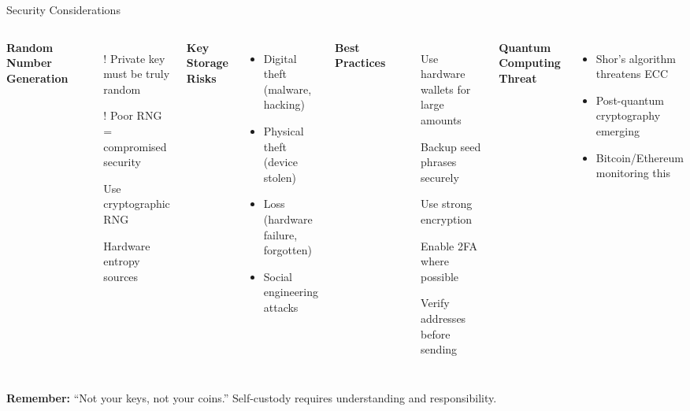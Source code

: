\documentclass[8pt,aspectratio=169]{beamer}
\begin{document}
\begin{frame}[t]{Security Considerations}
\begin{columns}[T]
\textbf{Random Number Generation}

\begin{itemize}
\item[\textcolor{mlred}{!}] Private key must be truly random
\item[\textcolor{mlred}{!}] Poor RNG = compromised security
\item[\textcolor{mlgreen}{\checkmark}] Use cryptographic RNG
\item[\textcolor{mlgreen}{\checkmark}] Hardware entropy sources
\end{itemize}

\vspace{0.5em}
\textbf{Key Storage Risks}
\begin{itemize}
\item Digital theft (malware, hacking)
\item Physical theft (device stolen)
\item Loss (hardware failure, forgotten)
\item Social engineering attacks
\end{itemize}

\textbf{Best Practices}

\begin{itemize}
\item[\textcolor{mlgreen}{\checkmark}] Use hardware wallets for large amounts
\item[\textcolor{mlgreen}{\checkmark}] Backup seed phrases securely
\item[\textcolor{mlgreen}{\checkmark}] Use strong encryption
\item[\textcolor{mlgreen}{\checkmark}] Enable 2FA where possible
\item[\textcolor{mlgreen}{\checkmark}] Verify addresses before sending
\end{itemize}

\vspace{0.5em}
\textbf{Quantum Computing Threat}
\begin{itemize}
\item Shor's algorithm threatens ECC
\item Post-quantum cryptography emerging
\item Bitcoin/Ethereum monitoring this
\end{itemize}
\end{columns}

\vspace{0.5em}
\begin{center}
\colorbox{mllavender4}{\parbox{0.85\textwidth}{\centering
\textbf{Remember:} ``Not your keys, not your coins.'' Self-custody requires understanding and responsibility.
}}
\end{center}
\end{frame}
\end{document}
